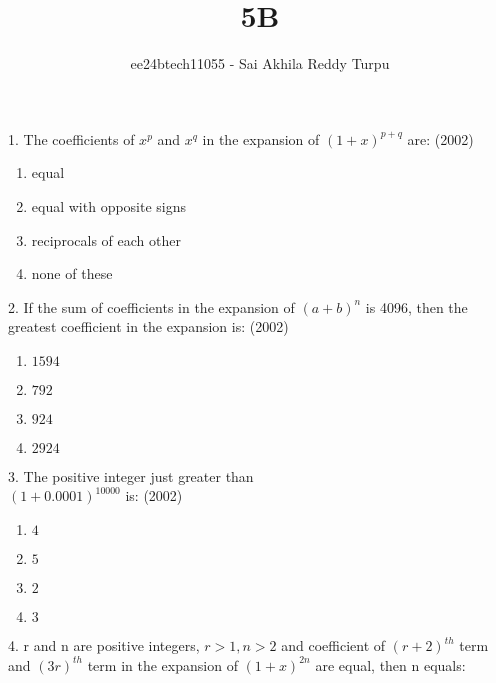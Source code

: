 \documentclass[journal,12pt,twocolumn]{IEEEtran}
\theoremstyle{remark}
\begin{document}

\vspace{3cm}

\title{5B}
\author{ee24btech11055 - Sai Akhila Reddy Turpu}
\maketitle
\newpage
\bigskip

\renewcommand{\thefigure}{\theenumi}
\renewcommand{\thetable}{\theenumi}
1. The coefficients of $x^p$ and $x^q$ in the expansion of $(1+x)^{p+q}$ are:
\hfill{(2002)}
\begin{enumerate}[label=(\alph*)]
\item equal
\item equal with opposite signs
\item reciprocals of each other
\item none of these
\end{enumerate}
2. If the sum of coefficients in the expansion of $(a+b)^n$ is 4096, then the greatest coefficient in the expansion is:  
\hfill{(2002)}
\begin{enumerate}[label=(\alph*)]
\item $1594$
\item $792$
\item $924$
\item $2924$
\end{enumerate}
3. The positive integer just greater than \\
$(1+0.0001)^{10000}$ is: 
\hfill{(2002)}
\begin{enumerate}[label=(\alph*)]
\item $4$
\item $5$
\item $2$
\item $3$
\end{enumerate}
4. r and n are positive integers, $r>1, n>2$ and coefficient of $(r+2)^{th}$ term and $(3r)^{th}$ term in the expansion of $(1+x)^{2n}$ are equal, then n equals:
\end{document}
